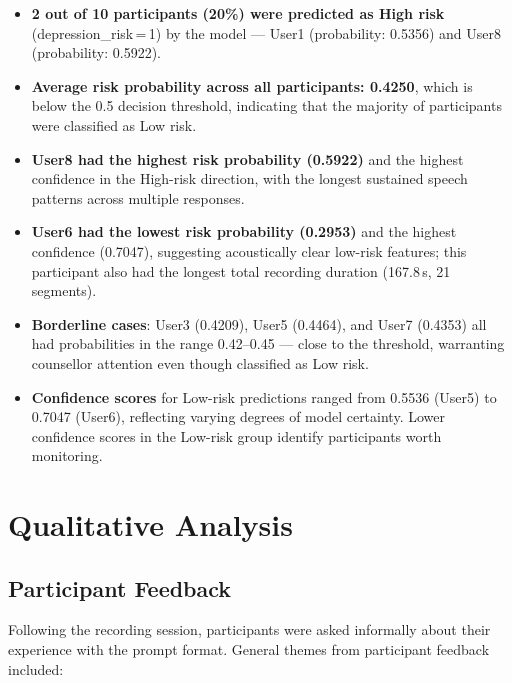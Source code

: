\begin{itemize}
    \item \textbf{2 out of 10 participants (20\%) were predicted as High risk} (depression\_risk\,=\,1) by the model — User1 (probability: 0.5356) and User8 (probability: 0.5922).
    \item \textbf{Average risk probability across all participants: 0.4250}, which is below the 0.5 decision threshold, indicating that the majority of participants were classified as Low risk.
    \item \textbf{User8 had the highest risk probability (0.5922)} and the highest confidence in the High-risk direction, with the longest sustained speech patterns across multiple responses.
    \item \textbf{User6 had the lowest risk probability (0.2953)} and the highest confidence (0.7047), suggesting acoustically clear low-risk features; this participant also had the longest total recording duration (167.8\,s, 21 segments).
    \item \textbf{Borderline cases}: User3 (0.4209), User5 (0.4464), and User7 (0.4353) all had probabilities in the range 0.42–0.45 — close to the threshold, warranting counsellor attention even though classified as Low risk.
    \item \textbf{Confidence scores} for Low-risk predictions ranged from 0.5536 (User5) to 0.7047 (User6), reflecting varying degrees of model certainty. Lower confidence scores in the Low-risk group identify participants worth monitoring.
\end{itemize}


\section{Qualitative Analysis}

\subsection{Participant Feedback}

Following the recording session, participants were asked informally about their experience with the prompt format. General themes from participant feedback included:

